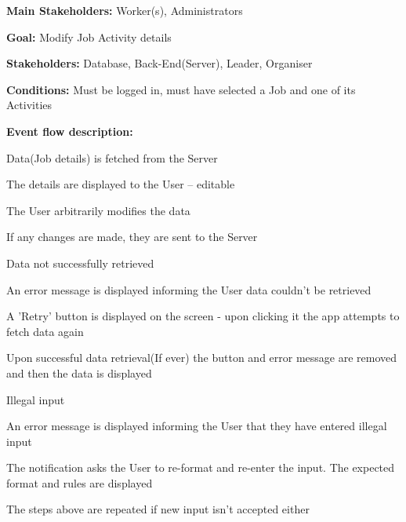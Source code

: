 			\noindent {}
			\begin{packed_item}
				\item \textbf{Main Stakeholders:} Worker(s), Administrators
				\item \textbf{Goal:} Modify Job Activity details
				\item \textbf{Stakeholders: } Database, Back-End(Server), Leader, Organiser
				\item \textbf{Conditions: } Must be logged in, must have selected a Job and one of its Activities
				\item \textbf{Event flow description: }
				\begin{packed_enum}
					\item Data(Job details) is fetched from the Server
					\item The details are displayed to the User -- editable
					\item The User arbitrarily modifies the data
					\item If any changes are made, they are sent to the Server
				\end{packed_enum}
				
				\begin{packed_item}
					\item[1.a] Data not successfully retrieved
					\item[] \begin{packed_enum}
						\item An error message is displayed informing the User data couldn't be retrieved
						\item A 'Retry' button is displayed on the screen - upon clicking it the app attempts to fetch data again
						\item Upon successful data retrieval(If ever) the button and error message are removed and then the data is displayed
					\end{packed_enum}
					
					\item[3.a] Illegal input
					\item[] \begin{packed_enum}
						\item An error message is displayed informing the User that they have entered illegal input
						\item The notification asks the User to re-format and re-enter the input. The expected format and rules are displayed
						\item The steps above are repeated if new input isn't accepted either
					\end{packed_enum}
					

\end{packed_item}
\end{packed_item}
